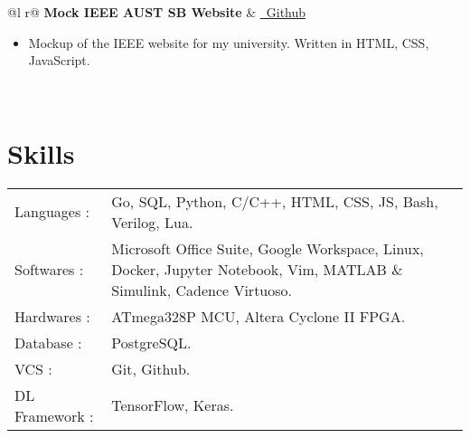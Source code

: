 \documentclass[a4paper,12pt]{article}
\begin{document}
\begin{tabularx}{\linewidth}{ @{}l r@{} }
\textbf{Mock IEEE AUST SB Website} & \hfill \href{https://github.com/schlafer/ieee_mock_website}{\raisebox{-0.05\height}\faGithub\ Github}  \\ [3.75pt]
{\begin{itemize}
    \item Mockup of the IEEE website for my university. Written in HTML, CSS, JavaScript.
\end{itemize}}  \\

\end{tabularx}


\section{Skills}
\begin{tabularx}{\linewidth}{@{}l X@{}}
Languages : &  \normalsize{Go, SQL, Python, C/C++, HTML, CSS, JS, Bash, Verilog, Lua.}\\
Softwares : &  \normalsize{Microsoft Office Suite, Google Workspace, Linux, Docker, Jupyter Notebook, Vim, MATLAB \& Simulink, Cadence Virtuoso.}\\
Hardwares : &  \normalsize{ATmega328P MCU, Altera Cyclone II FPGA.}\\
Database : &  \normalsize{PostgreSQL.}\\  
VCS : &  \normalsize{Git, Github.}\\
DL Framework : & \normalsize{TensorFlow, Keras.}\\
\end{tabularx}

\end{document}
